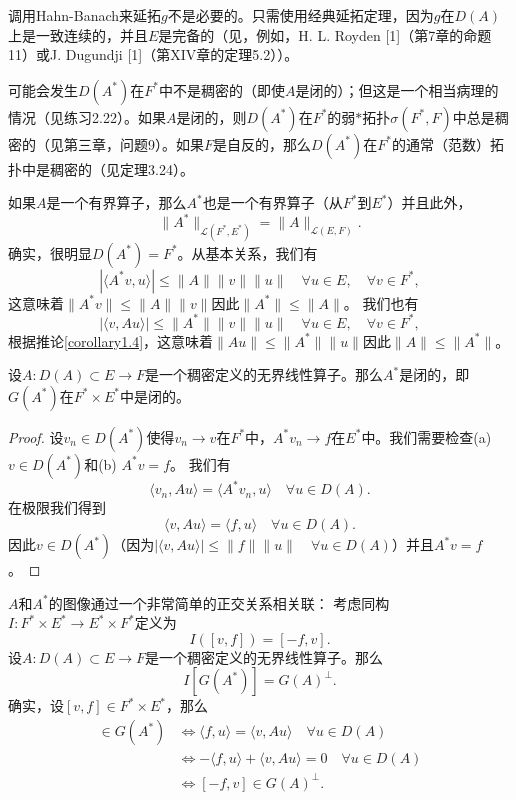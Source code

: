\begin{remark}
调用Hahn-Banach来延拓$g$不是必要的。只需使用经典延拓定理，因为$g$在$D(A)$上是一致连续的，并且$E$是完备的（见，例如，H. L. Royden [1]（第7章的命题11）或J. Dugundji [1]（第XIV章的定理5.2））。
\end{remark}

\begin{remark}
可能会发生$D(A^*)$在$F^*$中不是稠密的（即使$A$是闭的）；但这是一个相当病理的情况（见练习2.22）。如果$A$是闭的，则$D(A^*)$在$F^*$的弱$*$拓扑$\sigma(F^*,F)$中总是稠密的（见第三章，问题9）。如果$F$是自反的，那么$D(A^*)$在$F^*$的通常（范数）拓扑中是稠密的（见定理3.24）。
\end{remark}

\begin{remark}
如果$A$是一个有界算子，那么$A^*$也是一个有界算子（从$F^*$到$E^*$）并且此外，
\[ \|A^*\|_{\mathcal{L}(F^*,E^*)} = \|A\|_{\mathcal{L}(E,F)}. \]
确实，很明显$D(A^*)=F^*$。从基本关系，我们有
\[ |\langle A^*v, u \rangle| \leq \|A\| \|v\| \|u\| \quad \forall u \in E, \quad \forall v \in F^*, \]
这意味着$\|A^*v\| \leq \|A\| \|v\|$因此$\|A^*\| \leq \|A\|$。
我们也有
\[ |\langle v, Au \rangle| \leq \|A^*\| \|v\| \|u\| \quad \forall u \in E, \quad \forall v \in F^*, \]
根据推论\ref{corollary1.4}，这意味着$\|Au\| \leq \|A^*\|\|u\|$因此$\|A\| \leq \|A^*\|$。
\end{remark}

\begin{proposition}\label{proposition2.17}
设$A:D(A) \subset E \to F$是一个稠密定义的无界线性算子。那么$A^*$是闭的，即$G(A^*)$在$F^* \times E^*$中是闭的。
\end{proposition}
\begin{proof}
设$v_n \in D(A^*)$使得$v_n \to v$在$F^*$中，$A^*v_n \to f$在$E^*$中。我们需要检查(a) $v \in D(A^*)$和(b) $A^*v=f$。
我们有
\[ \langle v_n, Au \rangle = \langle A^*v_n, u \rangle \quad \forall u \in D(A). \]
在极限我们得到
\[ \langle v, Au \rangle = \langle f, u \rangle \quad \forall u \in D(A). \]
因此$v \in D(A^*)$（因为$|\langle v, Au \rangle| \leq \|f\|\|u\| \quad \forall u \in D(A)$）并且$A^*v=f$。
\end{proof}
$A$和$A^*$的图像通过一个非常简单的正交关系相关联：
考虑同构$I:F^* \times E^* \to E^* \times F^*$定义为
\[ I([v,f]) = [-f, v]. \]
设$A:D(A) \subset E \to F$是一个稠密定义的无界线性算子。那么
\[ I[G(A^*)] = G(A)^\perp. \]
确实，设$[v,f] \in F^* \times E^*$，那么
\begin{align*}
[v,f] \in G(A^*) &\iff \langle f,u \rangle = \langle v,Au \rangle \quad \forall u \in D(A) \\
&\iff -\langle f,u \rangle + \langle v,Au \rangle = 0 \quad \forall u \in D(A) \\
&\iff [-f,v] \in G(A)^\perp.
\end{align*}

